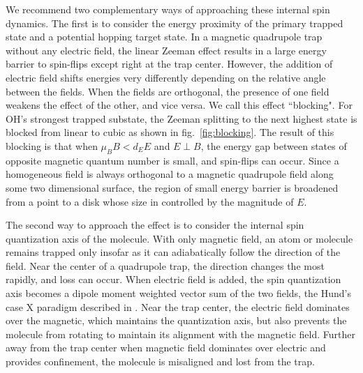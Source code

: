 \documentclass[%
 reprint,
 amsmath,amssymb,
 aps,
prl,
]{revtex4-1}
\begin{document}
We recommend two complementary ways of approaching these internal spin dynamics. The first is to consider the energy proximity of the primary trapped state and a potential hopping target state. In a magnetic quadrupole trap without any electric field, the linear Zeeman effect results in a large energy barrier to spin-flips except right at the trap center. However, the addition of electric field shifts energies very differently depending on the relative angle between the fields. When the fields are orthogonal, the presence of one field weakens the effect of the other, and vice versa. We call this effect ``blocking". For OH's strongest trapped substate, the Zeeman splitting to the next highest state is blocked from linear to cubic as shown in fig.~\ref{fig:blocking}.  The result of this blocking is that when $\mu_BB < d_EE$ and $E\!\perp\! B$, the energy gap between states of opposite magnetic quantum number is small, and spin-flips can occur. Since a homogeneous field is always orthogonal to a magnetic quadrupole field along some two dimensional surface, the region of small energy barrier is broadened from a point to a disk whose size in controlled by the magnitude of $E$. 

The second way to approach the effect is to consider the internal spin quantization axis of the molecule. With only magnetic field, an atom or molecule remains trapped only insofar as it can adiabatically follow the direction of the field. Near the center of a quadrupole trap, the direction changes the most rapidly, and loss can occur. When electric field is added, the spin quantization axis becomes a dipole moment weighted vector sum of the two fields, the Hund's case X paradigm described in \cite{Bohn2013}. Near the trap center, the electric field dominates over the magnetic, which maintains the quantization axis, but also prevents the molecule from rotating to maintain its alignment with the magnetic field. Further away from the trap center when magnetic field dominates over electric and provides confinement, the molecule is misaligned and lost from the trap.
\end{document}
